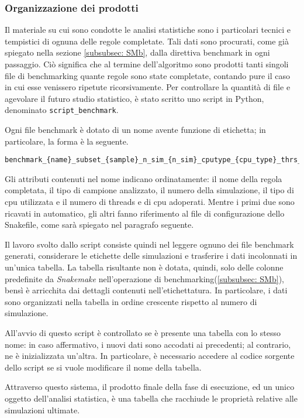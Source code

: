 \subsubsection{Organizzazione dei prodotti}
Il materiale su cui sono condotte le analisi statistiche sono i particolari tecnici e tempistici di ognuna delle regole completate.
Tali dati sono procurati, come già spiegato nella sezione \ref{subsubsec: SMb}, dalla direttiva benchmark in ogni passaggio.
Ciò significa che al termine dell'algoritmo sono prodotti tanti singoli file di benchmarking quante regole sono state completate, contando pure il caso in cui esse venissero ripetute ricorsivamente.
Per controllare la quantità di file e agevolare il futuro studio statistico, è stato scritto uno script in Python, denominato \verb!script_benchmark!.


Ogni file benchmark è dotato di un nome avente funzione di etichetta; in particolare, la forma è la seguente.
\begin{lstlisting}[basicstyle=\tiny]
benchmark_{name}_subset_{sample}_n_sim_{n_sim}_cputype_{cpu_type}_thrs_{thrs}_ncpu{n_cpu}.txt
\end{lstlisting}
Gli attributi contenuti nel nome indicano ordinatamente: il nome della regola completata, il tipo di campione analizzato, il numero della simulazione, il tipo di cpu utilizzata e il numero di threads e di cpu adoperati.
Mentre i primi due sono ricavati in automatico, gli altri fanno riferimento al file di configurazione dello Snakefile, come sarà spiegato nel paragrafo seguente.

Il lavoro svolto dallo script consiste quindi nel leggere ognuno dei file benchmark generati, considerare le etichette delle simulazioni e trasferire i dati incolonnati in un'unica tabella.
La tabella risultante non è dotata, quindi, solo delle colonne predefinite da \textit{Snakemake} nell'operazione di benchmarking(\ref{subsubsec: SMb}), bensì è arricchita dai dettagli contenuti nell'etichettatura.
In particolare, i dati sono organizzati nella tabella in ordine crescente rispetto al numero di simulazione.

All'avvio di questo script è controllato se è presente una tabella con lo stesso nome: in caso affermativo, i nuovi dati sono accodati ai precedenti; al contrario, ne è inizializzata un'altra.
In particolare, è necessario accedere al codice sorgente dello script se si vuole modificare il nome della tabella.

Attraverso questo sistema, il prodotto finale della fase di esecuzione, ed un unico oggetto dell'analisi statistica, è una tabella che racchiude le proprietà relative alle simulazioni ultimate.


